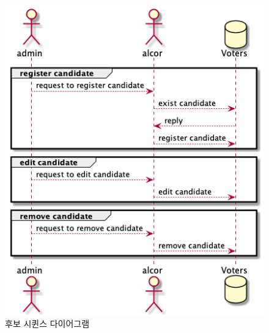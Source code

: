 \documentclass[8pt,a4paper,left=8mm,right=8mm,top=10mm,bottom=10mm]{article}
\begin{document}
    \begin{figure}[h]
        \begin{center}
            \includegraphics[width=15cm]{candidate-reg}
            \caption{후보 시퀸스 다이어그램}
        \end{center}
    \end{figure}
\end{document}
